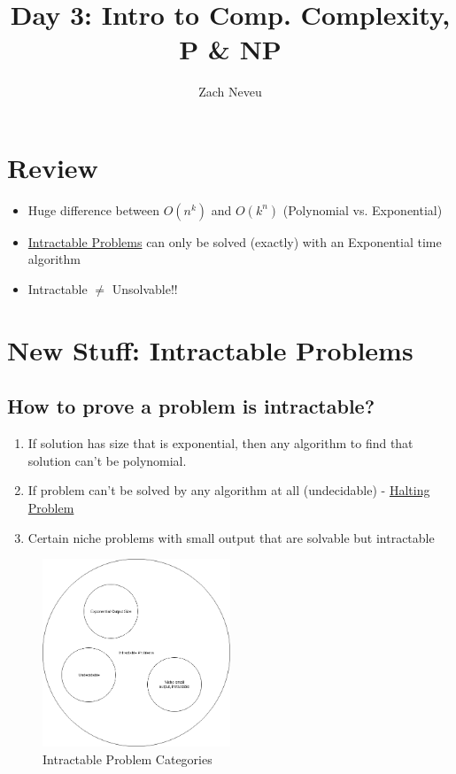 \documentclass[12pt, letter]{article}
\author{Zach Neveu}
\title{ Day 3: Intro to Comp. Complexity, P \& NP }
\begin{document}
\maketitle

\section{Review}%
\label{sec:review}
\begin{itemize}
	\item Huge difference between $O(n^k)$ and  $O(k^n)$ (Polynomial vs. Exponential)
	\item \underline{Intractable Problems} can only be solved (exactly) with an Exponential time algorithm
	\item Intractable $\ne$ Unsolvable!!
\end{itemize}

\section{New Stuff: Intractable Problems}%
\label{sec:new_stuff}
\subsection*{How to prove a problem is intractable?}
\begin{enumerate}
	\item If solution has size that is exponential, then any algorithm to find that solution can't be polynomial.
	\item If problem can't be solved by any algorithm at all (undecidable) - \href{https://en.wikipedia.org/wiki/Halting_problem}{Halting Problem}
	\item Certain niche problems with small output that are solvable but intractable
\end{enumerate}
\begin{figure}[h]
	\centering
	\includegraphics[width=0.5\textwidth]{imgs/intractable}
	\caption{Intractable Problem Categories}
	\label{fig:imgs-intractable}
\end{figure}
\end{document}
